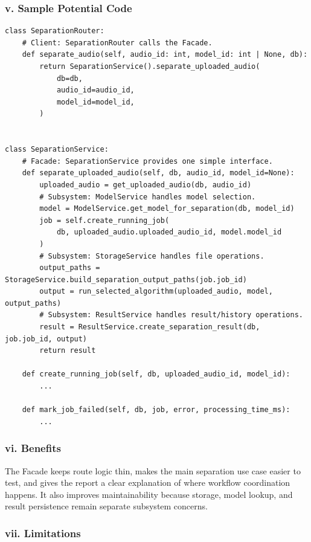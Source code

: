 \subsubsection{v. Sample Potential Code}

\begin{lstlisting}[caption={Facade Pattern Code Example}]
class SeparationRouter:
    # Client: SeparationRouter calls the Facade.
    def separate_audio(self, audio_id: int, model_id: int | None, db):
        return SeparationService().separate_uploaded_audio(
            db=db,
            audio_id=audio_id,
            model_id=model_id,
        )


class SeparationService:
    # Facade: SeparationService provides one simple interface.
    def separate_uploaded_audio(self, db, audio_id, model_id=None):
        uploaded_audio = get_uploaded_audio(db, audio_id)
        # Subsystem: ModelService handles model selection.
        model = ModelService.get_model_for_separation(db, model_id)
        job = self.create_running_job(
            db, uploaded_audio.uploaded_audio_id, model.model_id
        )
        # Subsystem: StorageService handles file operations.
        output_paths = StorageService.build_separation_output_paths(job.job_id)
        output = run_selected_algorithm(uploaded_audio, model, output_paths)
        # Subsystem: ResultService handles result/history operations.
        result = ResultService.create_separation_result(db, job.job_id, output)
        return result

    def create_running_job(self, db, uploaded_audio_id, model_id):
        ...

    def mark_job_failed(self, db, job, error, processing_time_ms):
        ...
\end{lstlisting}

\subsubsection{vi. Benefits}

The Facade keeps route logic thin, makes the main separation use case easier to test, and gives the report a clear explanation of where workflow coordination happens. It also improves maintainability because storage, model lookup, and result persistence remain separate subsystem concerns.

\subsubsection{vii. Limitations}

